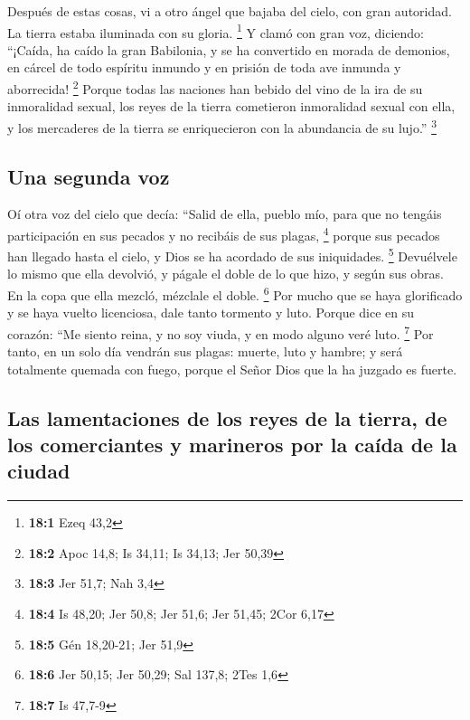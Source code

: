  Después de estas cosas, vi a otro ángel que bajaba del
cielo, con gran autoridad. La tierra estaba iluminada con su gloria.
\footnote{\textbf{18:1} Ezeq 43,2}  Y clamó con gran voz,
diciendo: ``¡Caída, ha caído la gran Babilonia, y se ha convertido en
morada de demonios, en cárcel de todo espíritu inmundo y en prisión de
toda ave inmunda y aborrecida! \footnote{\textbf{18:2} Apoc 14,8; Is
  34,11; Is 34,13; Jer 50,39}  Porque todas las naciones
han bebido del vino de la ira de su inmoralidad sexual, los reyes de la
tierra cometieron inmoralidad sexual con ella, y los mercaderes de la
tierra se enriquecieron con la abundancia de su lujo.'' \footnote{\textbf{18:3}
  Jer 51,7; Nah 3,4}

\hypertarget{una-segunda-voz}{%
\subsection{Una segunda voz}\label{una-segunda-voz}}

 Oí otra voz del cielo que decía: ``Salid de ella, pueblo
mío, para que no tengáis participación en sus pecados y no recibáis de
sus plagas, \footnote{\textbf{18:4} Is 48,20; Jer 50,8; Jer 51,6; Jer
  51,45; 2Cor 6,17}  porque sus pecados han llegado hasta
el cielo, y Dios se ha acordado de sus iniquidades. \footnote{\textbf{18:5}
  Gén 18,20-21; Jer 51,9}  Devuélvele lo mismo que ella
devolvió, y págale el doble de lo que hizo, y según sus obras. En la
copa que ella mezcló, mézclale el doble. \footnote{\textbf{18:6} Jer
  50,15; Jer 50,29; Sal 137,8; 2Tes 1,6}  Por mucho que se
haya glorificado y se haya vuelto licenciosa, dale tanto tormento y
luto. Porque dice en su corazón: ``Me siento reina, y no soy viuda, y en
modo alguno veré luto. \footnote{\textbf{18:7} Is 47,7-9} 
Por tanto, en un solo día vendrán sus plagas: muerte, luto y hambre; y
será totalmente quemada con fuego, porque el Señor Dios que la ha
juzgado es fuerte.

\hypertarget{las-lamentaciones-de-los-reyes-de-la-tierra-de-los-comerciantes-y-marineros-por-la-cauxedda-de-la-ciudad}{%
\subsection{Las lamentaciones de los reyes de la tierra, de los
comerciantes y marineros por la caída de la
ciudad}\label{las-lamentaciones-de-los-reyes-de-la-tierra-de-los-comerciantes-y-marineros-por-la-cauxedda-de-la-ciudad}}

